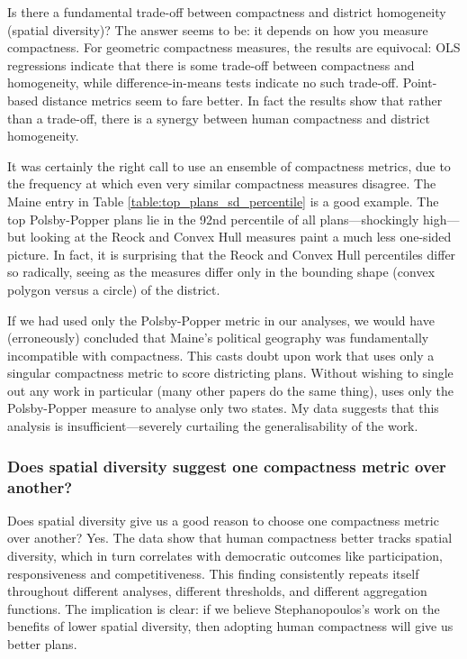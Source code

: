 \documentclass[]{article}
\begin{document}
Is there a fundamental trade-off between compactness and district
homogeneity (spatial diversity)? The answer seems to be: it depends on
how you measure compactness. For geometric compactness measures, the
results are equivocal: OLS regressions indicate that there is some
trade-off between compactness and homogeneity, while difference-in-means
tests indicate no such trade-off. Point-based distance metrics seem to
fare better. In fact the results show that rather than a trade-off,
there is a synergy between human compactness and district homogeneity.

It was certainly the right call to use an ensemble of compactness
metrics, due to the frequency at which even very similar compactness
measures disagree. The Maine entry in Table
\ref{table:top_plans_sd_percentile} is a good example. The top
Polsby-Popper plans lie in the 92nd percentile of all plans---shockingly
high---but looking at the Reock and Convex Hull measures paint a much
less one-sided picture. In fact, it is surprising that the Reock and
Convex Hull percentiles differ so radically, seeing as the measures
differ only in the bounding shape (convex polygon versus a circle) of
the district.

If we had used only the Polsby-Popper metric in our analyses, we would
have (erroneously) concluded that Maine's political geography was
fundamentally incompatible with compactness. This casts doubt upon work
that uses only a singular compactness metric to score districting plans.
Without wishing to single out any work in particular (many other papers
do the same thing), \cite{s2020} uses only the Polsby-Popper measure to
analyse only two states. My data suggests that this analysis is
insufficient---severely curtailing the generalisability of the work.

\hypertarget{does-spatial-diversity-suggest-one-compactness-metric-over-another}{%
\subsubsection{Does spatial diversity suggest one compactness metric
over
another?}\label{does-spatial-diversity-suggest-one-compactness-metric-over-another}}

Does spatial diversity give us a good reason to choose one compactness
metric over another? Yes. The data show that human compactness better
tracks spatial diversity, which in turn correlates with democratic
outcomes like participation, responsiveness and competitiveness. This
finding consistently repeats itself throughout different analyses,
different thresholds, and different aggregation functions. The
implication is clear: if we believe Stephanopoulos's work on the
benefits of lower spatial diversity, then adopting human compactness
will give us better plans.
\end{document}
